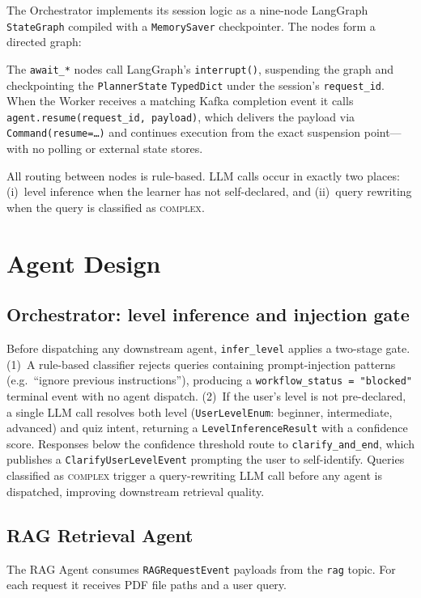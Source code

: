 \documentclass{ecai}
\begin{document}
The Orchestrator implements its session logic as a nine-node LangGraph
\texttt{StateGraph} compiled with a
\texttt{MemorySaver} checkpointer. The nodes form a directed graph:

The \texttt{await\_*} nodes call LangGraph's \texttt{interrupt()},
suspending the graph and checkpointing the \texttt{PlannerState}
\texttt{TypedDict} under the session's \texttt{request\_id}. When the
Worker receives a matching Kafka completion event it calls
\texttt{agent.resume(request\_id,~payload)}, which delivers the payload
via \texttt{Command(resume=\ldots)} and continues execution from the exact
suspension point---with no polling or external state stores.

All routing between nodes is rule-based. LLM calls occur in exactly two
places: (i)~level inference when the learner has not self-declared, and
(ii)~query rewriting when the query is classified as \textsc{complex}.

\section{Agent Design}

\subsection{Orchestrator: level inference and injection gate}

Before dispatching any downstream agent, \texttt{infer\_level} applies a
two-stage gate. (1)~A rule-based classifier rejects queries containing
prompt-injection patterns (e.g.\ ``ignore previous instructions''),
producing a \texttt{workflow\_status~=~"blocked"} terminal event with no
agent dispatch. (2)~If the user's level is not pre-declared, a single LLM
call resolves both level (\texttt{UserLevelEnum}: beginner, intermediate,
advanced) and quiz intent, returning a \texttt{LevelInferenceResult} with
a confidence score. Responses below the confidence threshold route to
\texttt{clarify\_and\_end}, which publishes a
\texttt{ClarifyUserLevelEvent} prompting the user to self-identify. Queries
classified as \textsc{complex} trigger a query-rewriting LLM call before
any agent is dispatched, improving downstream retrieval quality.

\subsection{RAG Retrieval Agent}

The RAG Agent consumes \texttt{RAGRequestEvent} payloads from the
\texttt{rag} topic. For each request it receives PDF file paths and a
user query.
\end{document}
